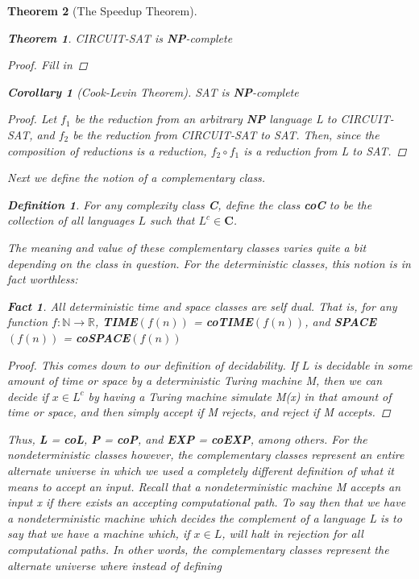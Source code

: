 \documentclass{article}
\theoremstyle{definition}
\newtheorem{definition}{Definition}[section]
\theoremstyle{plain}
\theoremstyle{theorem}
\newtheorem{fact}{Fact}[section]
\newtheorem{theorem}{Theorem}[section]
\newtheorem{corollary}{Corollary}[section]
\begin{document}
\begin{theorem}[The Speedup Theorem]
\begin{theorem}
    CIRCUIT-SAT is \textbf{NP}-complete
\end{theorem}
\begin{proof}
Fill in
\end{proof}
\begin{corollary}[Cook-Levin Theorem]
    SAT is \textbf{NP}-complete
\end{corollary}
\begin{proof}
Let $f_1$ be the reduction from an arbitrary \textbf{NP} language L to CIRCUIT-SAT, and $f_2$ be the reduction from CIRCUIT-SAT to SAT. Then, since the composition of reductions is a reduction, $f_2 \circ f_1$ is a reduction from L to SAT. 
\end{proof}
Next we define the notion of a complementary class.
\begin{definition}
    For any complexity class \textbf{C}, define the class \textbf{coC} to be the collection of all languages $L$ such that $L^c \in \textbf{C}$. 
\end{definition}
The meaning and value of these complementary classes varies quite a bit depending on the class in question. For the deterministic classes, this notion is in fact worthless:
\begin{fact}
All deterministic time and space classes are self dual. That is, for any function $f:\mathbb{N} \to \mathbb{R}$, \textbf{TIME$(f(n))$} = \textbf{coTIME$(f(n))$}, and  \textbf{SPACE$(f(n))$} = \textbf{coSPACE$(f(n))$}
\end{fact}
\begin{proof}
    This comes down to our definition of decidability. If $L$ is decidable in some amount of time or space by a deterministic Turing machine M, then we can decide if $x \in L^c$ by having a Turing machine simulate M(x) in that amount of time or space, and then simply accept if M rejects, and reject if M accepts. 
\end{proof}
Thus, \textbf{L} = \textbf{coL}, \textbf{P} = \textbf{coP}, and \textbf{EXP} = \textbf{coEXP}, among others. For the nondeterministic classes however, the complementary classes represent an entire alternate universe in which we used a completely different definition of what it means to accept an input. Recall that a nondeterministic machine M accepts an input x if \textit{there exists} an accepting computational path. To say then that we have a nondeterministic machine which decides the complement of a language L is to say that we have a machine which, if $x \in L$, will halt in rejection \textit{for all} computational paths. In other words, the complementary classes represent the alternate universe where instead of defining

\end{theorem}
\end{document}
